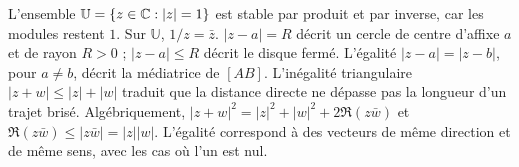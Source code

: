 L'ensemble $\mathbb U=\{z\in\mathbb{C}:|z|=1\}$ est stable par produit et par inverse, car les modules restent $1$.
Sur $\mathbb U$, $1/z=\bar z$.
$|z-a|=R$ décrit un cercle de centre d'affixe $a$ et de rayon $R>0$ ; $|z-a|\leq R$ décrit le disque fermé.
L'égalité $|z-a|=|z-b|$, pour $a\ne b$, décrit la médiatrice de $[AB]$.
L'inégalité triangulaire $|z+w|\leq|z|+|w|$ traduit que la distance directe ne dépasse pas la longueur d'un trajet brisé.
Algébriquement, $|z+w|^2=|z|^2+|w|^2+2\Re(z\bar w)$ et $\Re(z\bar w)\leq|z\bar w|=|z||w|$.
L'égalité correspond à des vecteurs de même direction et de même sens, avec les cas où l'un est nul.

